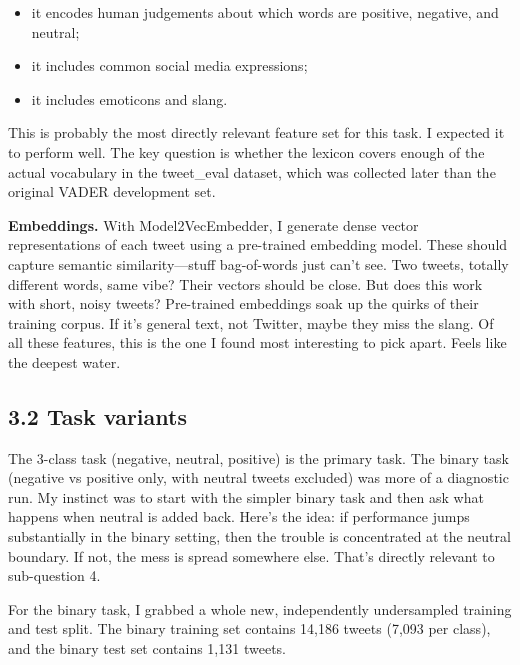 \documentclass[12pt]{article}
\begin{document}
\begin{itemize}

  \item it encodes human judgements about which words are positive, negative, and neutral;

  \item it includes common social media expressions;

  \item it includes emoticons and slang.

\end{itemize} This is probably the most directly relevant feature set for this task. I expected it to perform well. The key question is whether the lexicon covers enough of the actual vocabulary in the tweet\_eval dataset, which was collected later than the original VADER development set.

\textbf{Embeddings.} With Model2VecEmbedder, I generate dense vector representations of each tweet using a pre-trained embedding model. These should capture semantic similarity---stuff bag-of-words just can't see. Two tweets, totally different words, same vibe? Their vectors should be close. But does this work with short, noisy tweets? Pre-trained embeddings soak up the quirks of their training corpus. If it's general text, not Twitter, maybe they miss the slang. Of all these features, this is the one I found most interesting to pick apart. Feels like the deepest water.



\subsection*{3.2 Task variants}



The 3-class task (negative, neutral, positive) is the primary task. The binary task (negative vs positive only, with neutral tweets excluded) was more of a diagnostic run. My instinct was to start with the simpler binary task and then ask what happens when neutral is added back. Here's the idea: if performance jumps substantially in the binary setting, then the trouble is concentrated at the neutral boundary. If not, the mess is spread somewhere else. That's directly relevant to sub-question 4.

For the binary task, I grabbed a whole new, independently undersampled training and test split. The binary training set contains 14,186 tweets (7,093 per class), and the binary test set contains 1,131 tweets.
\end{document}
